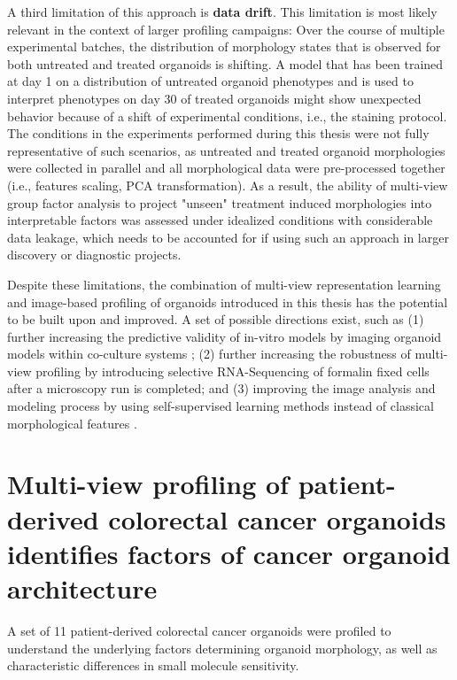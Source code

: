 \begin{flushleft}
A third limitation of this approach is \textbf{data drift}. This limitation is most likely relevant in the context of larger profiling campaigns: Over the course of multiple experimental batches, the distribution of morphology states that is observed for both untreated and treated organoids is shifting. A model that has been trained at day 1 on a distribution of untreated organoid phenotypes and is used to interpret phenotypes on day 30 of treated organoids might show unexpected behavior because of a shift of experimental conditions, i.e., the staining protocol. The conditions in the experiments performed during this thesis were not fully representative of such scenarios, as untreated and treated organoid morphologies were collected in parallel and all morphological data were pre-processed together (i.e., features scaling, PCA transformation). As a result, the ability of multi-view group factor analysis to project "unseen" treatment induced morphologies into interpretable factors was assessed under idealized conditions with considerable data leakage, which needs to be accounted for if using such an approach in larger discovery or diagnostic projects.
\par
\bigbreak

Despite these limitations, the combination of multi-view representation learning and image-based profiling of organoids introduced in this thesis has the potential to be built upon and improved. A set of possible directions exist, such as (1) further increasing the predictive validity of in-vitro models by imaging organoid models within co-culture systems \parencite{cattaneoTumorOrganoidCell2020}; (2) further increasing the robustness of multi-view profiling by introducing selective RNA-Sequencing of formalin fixed cells after a microscopy run is completed; and (3) improving the image analysis and modeling process by using self-supervised learning methods instead of classical morphological features \parencite{perakisContrastiveLearningSingleCell2021}.

\clearpage
\section{Multi-view profiling of patient-derived colorectal cancer organoids identifies factors of cancer organoid architecture}

A set of 11 patient-derived colorectal cancer organoids were profiled to understand the underlying factors determining organoid morphology, as well as characteristic differences in small molecule sensitivity.


\end{flushleft}
